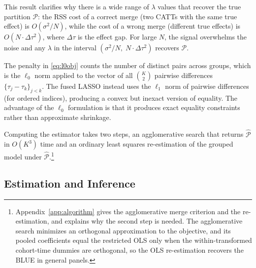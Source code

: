 \documentclass[margin=5in, 12pt]{article}
\newcommand{\1}{\mathbbm{1}}
\begin{document}
  \noindent This result clarifies why there is a wide range of $\lambda$ values that recover the true partition $\mathcal{P}$:
  the RSS cost of a correct merge (two CATTs with the same true effect) is $O(\sigma^2/N)$, while the cost of a wrong merge
  (different true effects) is $O(N \cdot \Delta\tau^2)$, where $\Delta\tau$ is the effect gap. For large $N$, the signal
  overwhelms the noise and any $\lambda$ in the interval $(\sigma^2/N,\; N \cdot \Delta\tau^2)$ recovers $\mathcal{P}$.

  The penalty in \eqref{eq:l0obj} counts the number of distinct pairs across groups, which is the $\ell_0$ norm applied to the
  vector of all $\binom{K}{2}$ pairwise differences $\{\tau_j - \tau_k\}_{j < k}$. The fused LASSO \citep{Tibshirani2005} instead
   uses the $\ell_1$ norm of pairwise differences (for ordered indices), producing a convex but inexact version of equality. The
  advantage of the $\ell_0$ formulation is that it produces exact equality constraints rather than approximate shrinkage.

  Computing the estimator takes two steps, an agglomerative search that returns $\hat{\mathcal{P}}$ in $O(K^3)$ time and an ordinary least squares re-estimation of the grouped model under $\hat{\mathcal{P}}$.\footnote{Appendix~\ref{app:algorithm} gives the agglomerative merge criterion and the re-estimation, and explains why the second step is needed. The agglomerative search minimizes an orthogonal approximation to the objective, and its pooled coefficients equal the restricted OLS only when the within-transformed cohort-time dummies are orthogonal, so the OLS re-estimation recovers the BLUE in general panels.}

  \subsection{Estimation and Inference}\label{sec:bayes:gibbs}
\end{document}
